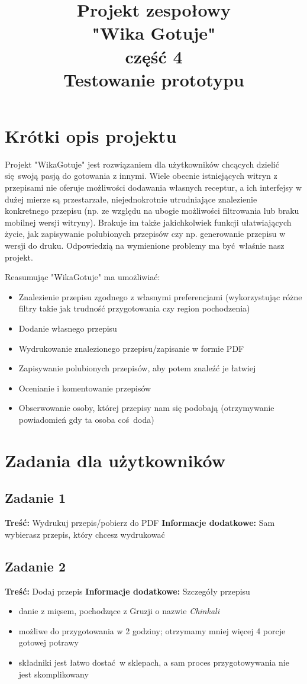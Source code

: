 \documentclass{article}
\title{\fontsize{20}{22}\selectfont Projekt zespołowy\\ "Wika Gotuje" \\ część 4\\Testowanie prototypu}
\begin{document}
\section{Krótki opis projektu}
Projekt "WikaGotuje" jest rozwiązaniem dla użytkowników chcących dzielić się swoją pasją do gotowania z innymi. Wiele obecnie istniejących witryn z przepisami nie oferuje możliwości
dodawania własnych receptur, a ich interfejsy w dużej mierze są przestarzałe, niejednokrotnie utrudniające znalezienie konkretnego przepisu (np. ze względu na ubogie możliwości
filtrowania lub braku mobilnej wersji witryny). Brakuje im także jakichkolwiek funkcji ułatwiających życie, jak zapisywanie polubionych przepisów czy np. generowanie
przepisu w wersji do druku. Odpowiedzią na wymienione problemy ma być właśnie nasz projekt.\newline

Reasumując "WikaGotuje" ma umożliwiać:
\begin{itemize}
  \item Znalezienie przepisu zgodnego z własnymi preferencjami (wykorzystując różne filtry takie jak trudność przygotowania czy region pochodzenia)
  \item Dodanie własnego przepisu
  \item Wydrukowanie znalezionego przepisu/zapisanie w formie PDF
  \item Zapisywanie polubionych przepisów, aby potem znaleźć je łatwiej
  \item Ocenianie i komentowanie przepisów
  \item Obserwowanie osoby, której przepisy nam się podobają (otrzymywanie powiadomień gdy ta osoba coś doda)
\end{itemize}

\section{Zadania dla użytkowników}
\subsection{Zadanie 1}
\textbf{Treść:} Wydrukuj przepis/pobierz do PDF\newline
\textbf{Informacje dodatkowe:} Sam wybierasz przepis, który chcesz wydrukować  

\subsection{Zadanie 2}
\textbf{Treść:} Dodaj przepis\newline
\textbf{Informacje dodatkowe:} Szczegóły przepisu
\begin{itemize}
  \item danie z mięsem, pochodzące z Gruzji o nazwie \textit{Chinkali}
  \item możliwe do przygotowania w 2 godziny; otrzymamy mniej więcej 4 porcje gotowej potrawy
  \item składniki jest łatwo dostać w sklepach, a sam proces przygotowywania nie jest skomplikowany
\end{itemize}
\end{document}
